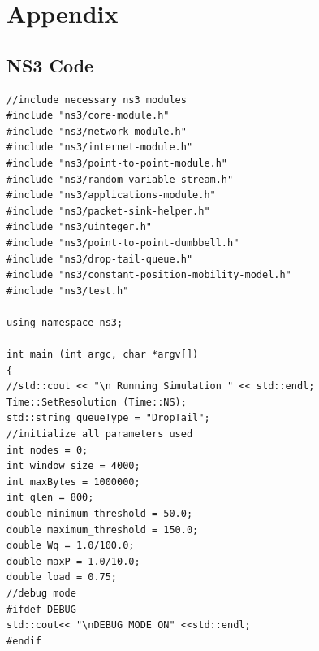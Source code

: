 \documentclass[paper=a4, fontsize=12pt]{scrartcl} %
\numberwithin{equation}{section} %
\numberwithin{figure}{section} %
\numberwithin{table}{section} %
\begin{document}
\section{Appendix}
\subsection{NS3 Code}
\lstset {language=C++}
\begin{lstlisting}
//include necessary ns3 modules
#include "ns3/core-module.h"
#include "ns3/network-module.h"
#include "ns3/internet-module.h"
#include "ns3/point-to-point-module.h"
#include "ns3/random-variable-stream.h"
#include "ns3/applications-module.h"
#include "ns3/packet-sink-helper.h"
#include "ns3/uinteger.h"
#include "ns3/point-to-point-dumbbell.h"
#include "ns3/drop-tail-queue.h"
#include "ns3/constant-position-mobility-model.h"
#include "ns3/test.h"

using namespace ns3;

int main (int argc, char *argv[])
{
//std::cout << "\n Running Simulation " << std::endl;
Time::SetResolution (Time::NS);
std::string queueType = "DropTail";
//initialize all parameters used
int nodes = 0; 
int window_size = 4000; 
int maxBytes = 1000000;
int qlen = 800;
double minimum_threshold = 50.0;
double maximum_threshold = 150.0;
double Wq = 1.0/100.0;
double maxP = 1.0/10.0;
double load = 0.75;
//debug mode
#ifdef DEBUG
std::cout<< "\nDEBUG MODE ON" <<std::endl;
#endif


\end{lstlisting}
\end{document}
